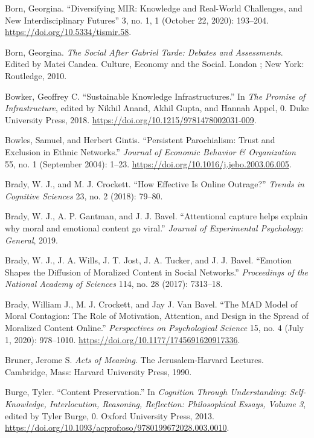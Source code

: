 \documentclass[phdthesis,12pt,final]{wuthesis}
\newlength{\cslhangindent}
\newenvironment{CSLReferences}[2] %
{\begin{list}{}{%
	\setlength{\itemindent}{0pt}
	\setlength{\leftmargin}{0pt}
	\setlength{\parsep}{0pt}
	\ifodd #1
	\setlength{\leftmargin}{\cslhangindent}
	\setlength{\itemindent}{-1\cslhangindent}
	\fi
	\setlength{\itemsep}{#2\baselineskip}}}
{\end{list}}
\theoremstyle{definition}
\theoremstyle{definition}
\theoremstyle{definition}
\theoremstyle{definition}
\theoremstyle{remark}
\begin{document}
\begin{CSLReferences}{1}{0}
Born, Georgina. {``Diversifying {MIR}: {Knowledge} and {Real-World Challenges}, and {New Interdisciplinary Futures}''} 3, no. 1, 1 (October 22, 2020): 193--204. \url{https://doi.org/10.5334/tismir.58}.

Born, Georgina. \emph{The Social After {Gabriel Tarde}: Debates and Assessments}. Edited by Matei Candea. Culture, Economy and the Social. London ; New York: Routledge, 2010.

Bowker, Geoffrey C. {``Sustainable {Knowledge Infrastructures}.''} In \emph{The {Promise} of {Infrastructure}}, edited by Nikhil Anand, Akhil Gupta, and Hannah Appel, 0. Duke University Press, 2018. \url{https://doi.org/10.1215/9781478002031-009}.

Bowles, Samuel, and Herbert Gintis. {``Persistent {Parochialism}: {Trust} and Exclusion in Ethnic Networks.''} \emph{Journal of Economic Behavior \& Organization} 55, no. 1 (September 2004): 1--23. \url{https://doi.org/10.1016/j.jebo.2003.06.005}.

Brady, W. J., and M. J. Crockett. {``How Effective Is Online Outrage?''} \emph{Trends in Cognitive Sciences} 23, no. 2 (2018): 79--80.

Brady, W. J., A. P. Gantman, and J. J. Bavel. {``Attentional capture helps explain why moral and emotional content go viral.''} \emph{Journal of Experimental Psychology: General}, 2019.

Brady, W. J., J. A. Wills, J. T. Jost, J. A. Tucker, and J. J. Bavel. {``Emotion Shapes the Diffusion of Moralized Content in Social Networks.''} \emph{Proceedings of the National Academy of Sciences} 114, no. 28 (2017): 7313--18.

Brady, William J., M. J. Crockett, and Jay J. Van Bavel. {``The {MAD} Model of Moral Contagion: The Role of Motivation, Attention, and Design in the Spread of Moralized Content Online.''} \emph{Perspectives on Psychological Science} 15, no. 4 (July 1, 2020): 978--1010. \url{https://doi.org/10.1177/1745691620917336}.

Bruner, Jerome S. \emph{Acts of Meaning}. The {Jerusalem-Harvard} Lectures. Cambridge, Mass: Harvard University Press, 1990.

Burge, Tyler. {``Content {Preservation}.''} In \emph{Cognition {Through Understanding}: {Self-Knowledge}, {Interlocution}, {Reasoning}, {Reflection}: {Philosophical Essays}, {Volume} 3}, edited by Tyler Burge, 0. Oxford University Press, 2013. \url{https://doi.org/10.1093/acprof:oso/9780199672028.003.0010}.


\end{CSLReferences}
\end{document}
